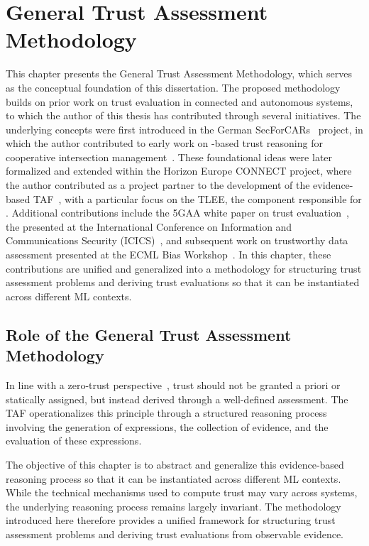 \chapter{General Trust Assessment Methodology }
\label{chap:Trust_method}
This chapter presents the General Trust Assessment Methodology, which serves as the conceptual foundation of this dissertation. The proposed methodology builds on prior work on trust evaluation in connected and autonomous systems, to which the author of this thesis has contributed through several initiatives. The underlying concepts were first introduced in the German SecForCARs~\cite{secforcars} project, in which the author contributed to early work on -based trust reasoning for cooperative intersection management~\cite{Kargl2023Securing}. These foundational ideas were later formalized and extended within the Horizon Europe CONNECT project, where the author contributed as a project partner to the development of the evidence-based \ac{TAF}~\cite{connect_d31_taf}, with a particular focus on the \ac{TLEE}, the component responsible for . Additional contributions include the 5GAA white paper on trust evaluation~\cite{5gaa_trust4cav_2025}, the  presented at the International Conference on Information and Communications Security (ICICS)~\cite{fotos2025actions}, and subsequent work on trustworthy data assessment presented at the ECML Bias Workshop~\cite{10.1007/978-3-032-19096-3_17}. In this chapter, these contributions are unified and generalized into a methodology for structuring trust assessment problems and deriving trust evaluations so that it can be instantiated across different \ac{ML} contexts.

\section{Role of the General Trust Assessment Methodology}
\label{sec:ch4_role} 
In line with a zero-trust perspective~\cite{rose2020zero}, trust should not be granted a priori or statically assigned, but instead derived through a well-defined assessment. The \acf{TAF} operationalizes this principle through a structured reasoning process involving the generation of expressions, the collection of evidence, and the evaluation of these expressions.

The objective of this chapter is to abstract and generalize this evidence-based reasoning process so that it can be instantiated across different \ac{ML} contexts. While the technical mechanisms used to compute trust may vary across systems, the underlying reasoning process remains largely invariant. The methodology introduced here therefore provides a unified framework for structuring trust assessment problems and deriving trust evaluations from observable evidence.

